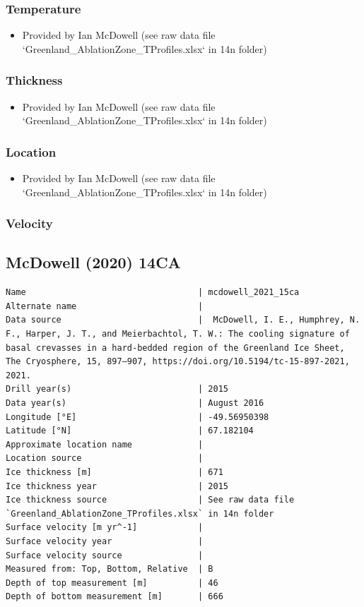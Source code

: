 \documentclass[article,a4paper,times,11pt,twoside]{article}
\begin{document}
\subsubsection{Temperature}
\label{sec:orgf236c6d}

\begin{itemize}
\item Provided by Ian McDowell (see raw data file `Greenland\_AblationZone\_TProfiles.xlsx` in 14n folder)
\end{itemize}

\subsubsection{Thickness}
\label{sec:org475d9e7}

\begin{itemize}
\item Provided by Ian McDowell (see raw data file `Greenland\_AblationZone\_TProfiles.xlsx` in 14n folder)
\end{itemize}

\subsubsection{Location}
\label{sec:orgf213720}

\begin{itemize}
\item Provided by Ian McDowell (see raw data file `Greenland\_AblationZone\_TProfiles.xlsx` in 14n folder)
\end{itemize}

\subsubsection{Velocity}
\label{sec:orgd93db84}
\clearpage
\subsection{McDowell (2020) 14CA}
\label{sec:org1dcfa01}
\begin{verbatim}
Name                                  | mcdowell_2021_15ca
Alternate name                        | 
Data source                           |  McDowell, I. E., Humphrey, N. F., Harper, J. T., and Meierbachtol, T. W.: The cooling signature of basal crevasses in a hard-bedded region of the Greenland Ice Sheet, The Cryosphere, 15, 897–907, https://doi.org/10.5194/tc-15-897-2021, 2021.
Drill year(s)                         | 2015
Data year(s)                          | August 2016
Longitude [°E]                        | -49.56950398
Latitude [°N]                         | 67.182104
Approximate location name             | 
Location source                       | 
Ice thickness [m]                     | 671
Ice thickness year                    | 2015
Ice thickness source                  | See raw data file `Greenland_AblationZone_TProfiles.xlsx` in 14n folder
Surface velocity [m yr^-1]            | 
Surface velocity year                 | 
Surface velocity source               | 
Measured from: Top, Bottom, Relative  | B
Depth of top measurement [m]          | 46
Depth of bottom measurement [m]       | 666
\end{verbatim}
\end{document}
